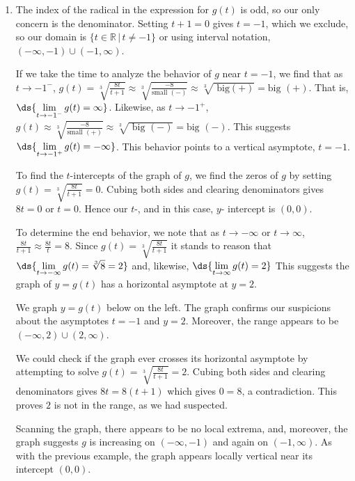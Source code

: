 \documentclass{ximera}
\begin{document}
\begin{example}
\begin{enumerate}

\item  The index of the radical  in the expression for $g(t)$ is odd, so our only concern is the denominator.  Setting $t+1=0$ gives $t=-1$, which we exclude, so our domain is $\{ t \in \mathbb{R} \, | \, t \neq -1\}$ or using interval notation, $(-\infty, -1) \cup (-1, \infty)$.    

If we take the time to analyze the behavior of $g$ near $t=-1$, we find that as $t \rightarrow -1^{-}$, $g(t) = \sqrt[3]{\frac{8t}{t+1}}  \approx \sqrt[3]{\frac{-8}{\text{small $(-)$}}}  \approx \sqrt[3]{\text{ big$(+)$}} = \text{big $(+)$}$.  That is, $\ds{\lim_{t \rightarrow -1^{-}} g(t) = \infty}$.  Likewise, as $t \rightarrow -1^{+}$, $g(t)  \approx \sqrt[3]{\frac{-8}{\text{small $(+)$}}}  \approx \sqrt[3]{\text{ big $(-)$}} = \text{big $(-)$}$.  This suggests  $\ds{\lim_{t \rightarrow -1^{+}} g(t) = -\infty}$.  This behavior points to a vertical asymptote, $t=-1$.

To find the $t$-intercepts of the graph of $g$, we find the zeros of $g$ by setting $g(t) = \sqrt[3]{\frac{8t}{t+1}} = 0$.  Cubing both sides and clearing denominators  gives $8t = 0$ or $t = 0$.  Hence our  $t$-, and in this case,  $y$- intercept is $(0,0)$.

To determine the end behavior, we note that as $t \rightarrow  -\infty$ or $t \rightarrow  \infty$,  $\frac{8t}{t+1} \approx \frac{8t}{t} = 8$.  Since  $g(t) = \sqrt[3]{\frac{8t}{t+1}}$  it stands to reason that $\ds{\lim_{ t \rightarrow -\infty} g(t) =  \sqrt[3]{8} = 2}$ and, likewise, $\ds{\lim_{ t \rightarrow \infty} g(t) = 2}$  This suggests the graph of $y = g(t)$ has a horizontal asymptote at $y = 2$.

We graph $y = g(t)$ below on the left. The graph confirms our suspicions about the asymptotes $t = -1$ and $y = 2$.  Moreover, the range appears to be $(-\infty, 2) \cup (2, \infty)$.  

We could check if the graph ever crosses its horizontal asymptote by attempting to solve $g(t) =  \sqrt[3]{\frac{8t}{t+1}} = 2$.  Cubing both sides and clearing denominators gives $8t = 8(t+1)$ which gives $0 = 8$, a contradiction.  This proves $2$ is not in the range, as we had suspected. 

Scanning the graph,  there  appears to be no local extrema, and, moreover,  the graph suggests $g$  is increasing on $(-\infty, -1)$ and again on $(-1, \infty)$.  As with the previous example, the graph appears locally vertical near its intercept $(0,0)$.


\end{enumerate}
\end{example}
\end{document}
